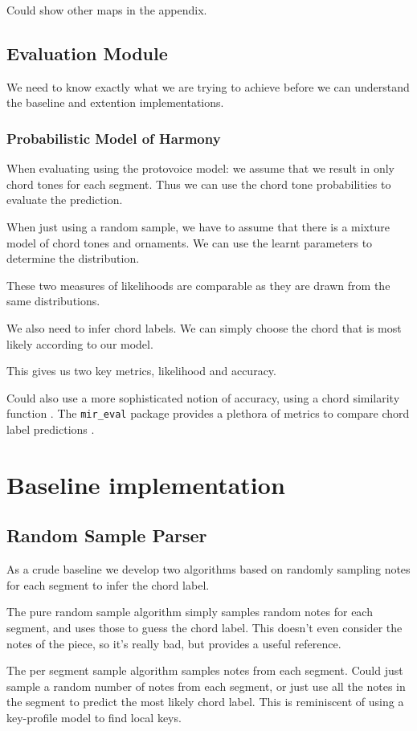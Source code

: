 \documentclass[12pt,a4paper,twoside,openright]{report}
\theoremstyle{definition}
\begin{document}
\par 
Could show other maps in the appendix.


\FloatBarrier
\subsection{Evaluation Module}
We need to know exactly what we are trying to achieve before we can understand the baseline and extention implementations.

\FloatBarrier
\subsubsection{Probabilistic Model of Harmony}
When evaluating using the protovoice model: we assume that we result in only chord tones for each segment. Thus we can use the chord tone probabilities to evaluate the prediction. 
\par
When just using a random sample, we have to assume that there is a mixture model of chord tones and ornaments. We can use the learnt parameters to determine the distribution.
\par
These two measures of likelihoods are comparable as they are drawn from the same distributions.
\par
We also need to infer chord labels. We can simply choose the chord that is most likely according to our model.
\par 
This gives us two key metrics, likelihood and accuracy.
\par
Could also use a more sophisticated notion of accuracy, using a chord similarity function \cite{humphreyFourTimelyInsights2015}. The {\texttt {mir\_eval}} package provides a plethora of metrics to compare chord label predictions \cite{raffelMirEvalTransparent2014}. 

\section{Baseline implementation}


\subsection{Random Sample Parser}
As a crude baseline we develop two algorithms based on randomly sampling notes for each segment to infer the chord label. 
\par
The pure random sample algorithm simply samples random notes for each segment, and uses those to guess the chord label. This doesn't even consider the notes of the piece, so it's really bad, but provides a useful reference.
\par 
The per segment sample algorithm samples notes from each segment. Could just sample a random number of notes from each segment, or just use all the notes in the segment to predict the most likely chord label. This is reminiscent of using a key-profile model \cite{temperleyBayesianApproachKeyFinding2002} to find local keys.
\end{document}
